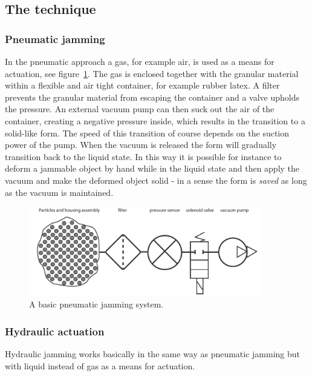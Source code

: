 \subsection{The technique}
\label{ch:jamming:technique}


\subsubsection{Pneumatic jamming}

In the pneumatic approach a gas, for example air, is used as a means for actuation, see figure~\ref{fig:ch:jamming:jamming-basics}.
The gas is enclosed together with the granular material within a flexible and air tight container, for example rubber latex. 
A filter prevents the granular material from escaping the container and a valve upholds the pressure.
An external vacuum pump can then suck out the air of the container, creating a negative pressure  inside, which results in the transition to a solid-like form. 
The speed of this transition of course depends on the suction power of the pump.
When the vacuum is released the form will gradually transition back to the liquid state. 
In this way it is possible for instance to deform a jammable object by hand while in the liquid state and then apply the vacuum and make the deformed object solid - in a sense the form is \emph{saved} as long as the vacuum is maintained.

\begin{figure}[hb]
	\centering
  		\includegraphics[width=4in]{figures/jamming/jamming-basics}
	\caption[A basic pneumatic jamming system.]
   {A basic pneumatic jamming system.}
   \label{fig:ch:jamming:jamming-basics}
\end{figure}

\subsubsection{Hydraulic actuation}
Hydraulic jamming works basically in the same way as pneumatic jamming but with liquid instead of gas as a means for actuation. 
